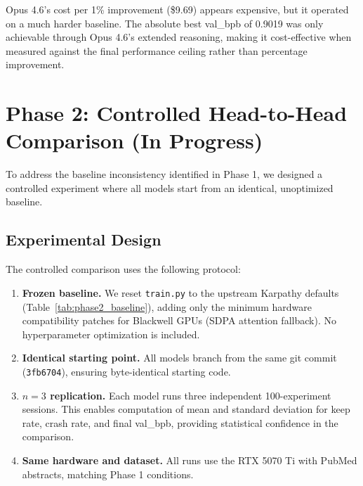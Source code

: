 \documentclass[11pt]{article}
\begin{document}
Opus 4.6's cost per 1\% improvement (\$9.69) appears expensive, but it operated on a much harder baseline. The absolute best val\_bpb of 0.9019 was only achievable through Opus 4.6's extended reasoning, making it cost-effective when measured against the final performance ceiling rather than percentage improvement.

\section{Phase 2: Controlled Head-to-Head Comparison (In Progress)}
\label{sec:phase2}

To address the baseline inconsistency identified in Phase 1, we designed a controlled experiment where all models start from an identical, unoptimized baseline.

\subsection{Experimental Design}
\label{sec:phase2_design}

The controlled comparison uses the following protocol:

\begin{enumerate}[leftmargin=*]
    \item \textbf{Frozen baseline.} We reset \texttt{train.py} to the upstream Karpathy defaults (Table~\ref{tab:phase2_baseline}), adding only the minimum hardware compatibility patches for Blackwell GPUs (SDPA attention fallback). No hyperparameter optimization is included.
    \item \textbf{Identical starting point.} All models branch from the same git commit (\texttt{3fb6704}), ensuring byte-identical starting code.
    \item \textbf{$n=3$ replication.} Each model runs three independent 100-experiment sessions. This enables computation of mean and standard deviation for keep rate, crash rate, and final val\_bpb, providing statistical confidence in the comparison.
    \item \textbf{Same hardware and dataset.} All runs use the RTX 5070 Ti with PubMed abstracts, matching Phase 1 conditions.
\end{enumerate}
\end{document}
